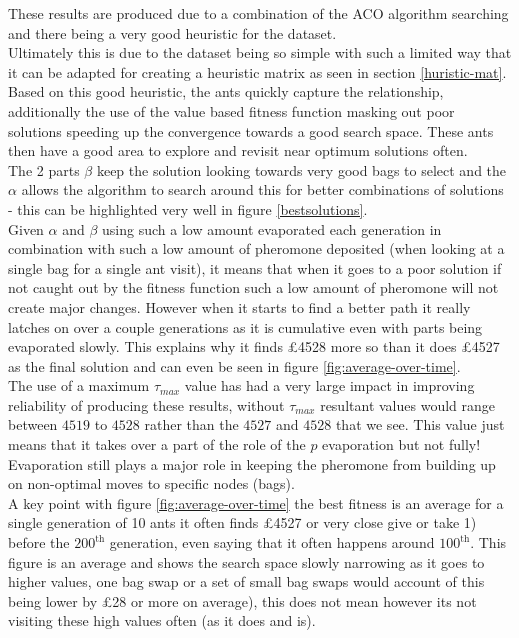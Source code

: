 \documentclass[11pt]{article}
\begin{document}
These results are produced due to a combination of the ACO algorithm searching and there being a very good heuristic for the dataset. \\

\noindent Ultimately this is due to the dataset being so simple with such a limited way that it can be adapted for creating a heuristic matrix as seen in section \ref{huristic-mat}. Based on this good heuristic, the ants quickly capture the relationship, additionally the use of the value based fitness function masking out poor solutions speeding up the convergence towards a good search space. These ants then have a good area to explore and revisit near optimum solutions often. \\

\noindent The 2 parts $\beta$ keep the solution looking towards very good bags to select and the $\alpha$ allows the algorithm to search around this for better combinations of solutions - this can be highlighted very well in figure \ref{bestsolutions}. \\

\noindent Given $\alpha$ and $\beta$ using such a low amount evaporated each generation in combination with such a low amount of pheromone deposited (when looking at a single bag for a single ant visit), it means that when it goes to a poor solution if not caught out by the fitness function such a low amount of pheromone will not create major changes. However when it starts to find a better path it really latches on over a couple generations as it is cumulative even with parts being evaporated slowly. This explains why it finds £4528 more so than it does £4527 as the final solution and can even be seen in figure \ref{fig:average-over-time}. \\

\noindent The use of a maximum $\tau_{max}$ value has had a very large impact in improving reliability of producing these results, without $\tau_{max}$ resultant values would range between $4519$ to $4528$ rather than the $4527$ and $4528$ that we see. This value just means that it takes over a part of the role of the $p$ evaporation but not fully! Evaporation still plays a major role in keeping the pheromone from building up on non-optimal moves to specific nodes (bags). \\ 

\noindent A key point with figure \ref{fig:average-over-time} the best fitness is an average for a single generation of 10 ants it often finds £4527 or very close give or take 1) before the $200^{\text{th}}$ generation, even saying that it often happens around $100^{\text{th}}$. This figure is an average and shows the search space slowly narrowing as it goes to higher values, one bag swap or a set of small bag swaps would account of this being lower by £28 or more on average), this does not mean however its not visiting these high values often (as it does and is).\\
\end{document}
